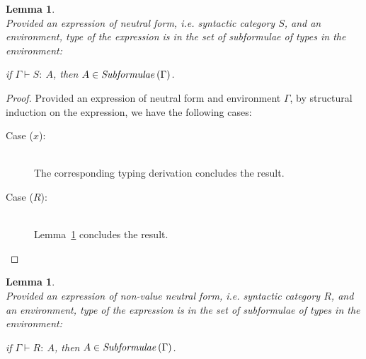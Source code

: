 \documentclass[11p,a4paper]{article}
\newcommand{\typecolor}{}
\newcommand{\termcolor}{}
\newcommand{\tp}[1]{{\typecolor #1}}
\newcommand{\tm}[1]{{\termcolor #1}}
\newtheorem{lemma}[theorem]{Lemma}
\newcommand{\expvar}[1]{#1}
\newcommand{\env}{\tp{\Gamma}}
\newcommand{\typing}[2]{\tm{#1:\ }\tp{#2}}
\newcommand{\txt}[1]{\text{\textit{#1}}}
\newcommand{\subformulae}[1]{\txt{Subformulae}\,(#1)}
\begin{document}
\begin{lemma}\ \\
\label{sub_S}
Provided an expression of neutral form, i.e. syntactic category $S$,
and an environment, type of the expression is in the set of
subformulae of types in the environment:
 
 if $\env \vdash \typing{S}{A}$, then $A \in \subformulae{\Gamma}$.
\end{lemma}

\begin{proof}
Provided an expression of neutral form and environment $\Gamma$,
by structural induction on the expression, we have the following cases:
\begin{description}
\item[Case ($\expvar{x}$):]\ \\ 
  The corresponding typing derivation concludes the result.
\item[Case ($R$):]\ \\
  Lemma~\ref{sub_R} concludes the result.   
\end{description}

\end{proof}

\begin{lemma}\ \\
\label{sub_R}
Provided an expression of non-value neutral form, i.e. syntactic
category $R$, and an environment, type of the expression is in the set
of subformulae of types in the environment:
 
 if $\Gamma \vdash \typing{R}{A}$, then $A \in \subformulae{\Gamma}$.
\end{lemma}
\end{document}
